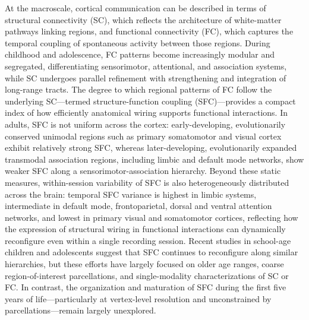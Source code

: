 At the macroscale, cortical communication can be described in terms of structural connectivity (SC), which reflects the architecture of white-matter pathways linking regions, and functional connectivity (FC), which captures the temporal coupling of spontaneous activity between those regions\cite{gaoDevelopmentHumanBrain2015,sylvesterNetworkspecificSelectivityFunctional2023,somanCorticalStructuralFunctional2023}. During childhood and adolescence, FC patterns become increasingly modular and segregated, differentiating sensorimotor, attentional, and association systems, while SC undergoes parallel refinement with strengthening and integration of long-range tracts\cite{sylvesterNetworkspecificSelectivityFunctional2023,sydnorNeurodevelopmentAssociationCortices2021}. The degree to which regional patterns of FC follow the underlying SC—termed structure-function coupling (SFC)—provides a compact index of how efficiently anatomical wiring supports functional interactions\cite{baumDevelopmentStructureFunction2020,sylvesterNetworkspecificSelectivityFunctional2023}. In adults, SFC is not uniform across the cortex: early-developing, evolutionarily conserved unimodal regions such as primary somatomotor and visual cortex exhibit relatively strong SFC, whereas later-developing, evolutionarily expanded transmodal association regions, including limbic and default mode networks, show weaker SFC along a sensorimotor-association hierarchy\cite{marguliesSituatingDefaultmodeNetwork2016, fotiadisMyelinationExcitationinhibitionBalance2023}. Beyond these static measures, within-session variability of SFC is also heterogeneously distributed across the brain: temporal SFC variance is highest in limbic systems, intermediate in default mode, frontoparietal, dorsal and ventral attention networks, and lowest in primary visual and somatomotor cortices, reflecting how the expression of structural wiring in functional interactions can dynamically reconfigure even within a single recording session\cite{fotiadisMyelinationExcitationinhibitionBalance2023}.
Recent studies in school-age children and adolescents suggest that SFC continues to reconfigure along similar hierarchies, but these efforts have largely focused on older age ranges, coarse region-of-interest parcellations, and single-modality characterizations of SC or FC\cite{xiaDevelopmentSensorimotorvisualConnectome2024,baumDevelopmentStructureFunction2020}. In contrast, the organization and maturation of SFC during the first five years of life---particularly at vertex-level resolution and unconstrained by parcellations---remain largely unexplored.



